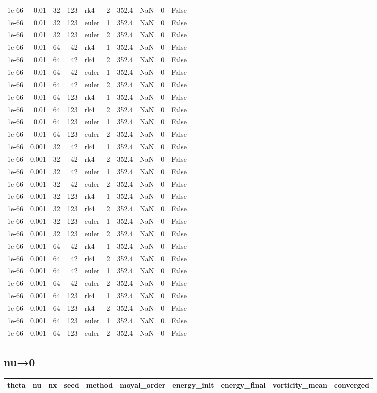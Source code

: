 \begin{tabular}{rrrrlrrrrr}
1e-66 & 0.01 & 32 & 123 & rk4 & 2 & 352.4 & NaN & 0 & False \\
1e-66 & 0.01 & 32 & 123 & euler & 1 & 352.4 & NaN & 0 & False \\
1e-66 & 0.01 & 32 & 123 & euler & 2 & 352.4 & NaN & 0 & False \\
1e-66 & 0.01 & 64 & 42 & rk4 & 1 & 352.4 & NaN & 0 & False \\
1e-66 & 0.01 & 64 & 42 & rk4 & 2 & 352.4 & NaN & 0 & False \\
1e-66 & 0.01 & 64 & 42 & euler & 1 & 352.4 & NaN & 0 & False \\
1e-66 & 0.01 & 64 & 42 & euler & 2 & 352.4 & NaN & 0 & False \\
1e-66 & 0.01 & 64 & 123 & rk4 & 1 & 352.4 & NaN & 0 & False \\
1e-66 & 0.01 & 64 & 123 & rk4 & 2 & 352.4 & NaN & 0 & False \\
1e-66 & 0.01 & 64 & 123 & euler & 1 & 352.4 & NaN & 0 & False \\
1e-66 & 0.01 & 64 & 123 & euler & 2 & 352.4 & NaN & 0 & False \\
1e-66 & 0.001 & 32 & 42 & rk4 & 1 & 352.4 & NaN & 0 & False \\
1e-66 & 0.001 & 32 & 42 & rk4 & 2 & 352.4 & NaN & 0 & False \\
1e-66 & 0.001 & 32 & 42 & euler & 1 & 352.4 & NaN & 0 & False \\
1e-66 & 0.001 & 32 & 42 & euler & 2 & 352.4 & NaN & 0 & False \\
1e-66 & 0.001 & 32 & 123 & rk4 & 1 & 352.4 & NaN & 0 & False \\
1e-66 & 0.001 & 32 & 123 & rk4 & 2 & 352.4 & NaN & 0 & False \\
1e-66 & 0.001 & 32 & 123 & euler & 1 & 352.4 & NaN & 0 & False \\
1e-66 & 0.001 & 32 & 123 & euler & 2 & 352.4 & NaN & 0 & False \\
1e-66 & 0.001 & 64 & 42 & rk4 & 1 & 352.4 & NaN & 0 & False \\
1e-66 & 0.001 & 64 & 42 & rk4 & 2 & 352.4 & NaN & 0 & False \\
1e-66 & 0.001 & 64 & 42 & euler & 1 & 352.4 & NaN & 0 & False \\
1e-66 & 0.001 & 64 & 42 & euler & 2 & 352.4 & NaN & 0 & False \\
1e-66 & 0.001 & 64 & 123 & rk4 & 1 & 352.4 & NaN & 0 & False \\
1e-66 & 0.001 & 64 & 123 & rk4 & 2 & 352.4 & NaN & 0 & False \\
1e-66 & 0.001 & 64 & 123 & euler & 1 & 352.4 & NaN & 0 & False \\
1e-66 & 0.001 & 64 & 123 & euler & 2 & 352.4 & NaN & 0 & False \\
\bottomrule
\end{tabular}
\subsection*{nu→0}
\begin{tabular}{rrrrlrrrrr}
\toprule
theta & nu & nx & seed & method & moyal_order & energy_init & energy_final & vorticity_mean & converged \\
\midrule
\bottomrule
\end{tabular}
